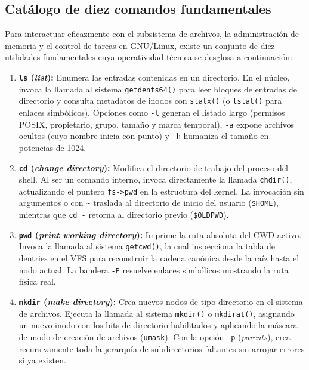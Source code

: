 \documentclass[12pt]{article}
\begin{document}
\subsection{Catálogo de diez comandos fundamentales}
\label{subsec:catalogoDiezComandosLinux}

Para interactuar eficazmente con el subsistema de archivos, la administración de memoria y el control de tareas en GNU/Linux, existe un conjunto de diez utilidades fundamentales cuya operatividad técnica se desglosa a continuación:

\begin{enumerate}[noitemsep, topsep=2pt]
    \item \textbf{\texttt{ls} (\textit{list}):} Enumera las entradas contenidas en un directorio. En el núcleo, invoca la llamada al sistema \texttt{getdents64()} para leer bloques de entradas de directorio y consulta metadatos de inodos con \texttt{statx()} (o \texttt{lstat()} para enlaces simbólicos). Opciones como \texttt{-l} generan el listado largo (permisos POSIX, propietario, grupo, tamaño y marca temporal), \texttt{-a} expone archivos ocultos (cuyo nombre inicia con punto) y \texttt{-h} humaniza el tamaño en potencias de 1024.
    \item \textbf{\texttt{cd} (\textit{change directory}):} Modifica el directorio de trabajo del proceso del shell. Al ser un comando interno, invoca directamente la llamada \texttt{chdir()}, actualizando el puntero \texttt{fs->pwd} en la estructura del kernel. La invocación sin argumentos o con \texttt{\textasciitilde} traslada al directorio de inicio del usuario (\texttt{\$HOME}), mientras que \texttt{cd -} retorna al directorio previo (\texttt{\$OLDPWD}).
    \item \textbf{\texttt{pwd} (\textit{print working directory}):} Imprime la ruta absoluta del CWD activo. Invoca la llamada al sistema \texttt{getcwd()}, la cual inspecciona la tabla de dentries en el VFS para reconstruir la cadena canónica desde la raíz hasta el nodo actual. La bandera \texttt{-P} resuelve enlaces simbólicos mostrando la ruta física real.
    \item \textbf{\texttt{mkdir} (\textit{make directory}):} Crea nuevos nodos de tipo directorio en el sistema de archivos. Ejecuta la llamada al sistema \texttt{mkdir()} o \texttt{mkdirat()}, asignando un nuevo inodo con los bits de directorio habilitados y aplicando la máscara de modo de creación de archivos (\texttt{umask}). Con la opción \texttt{-p} (\textit{parents}), crea recursivamente toda la jerarquía de subdirectorios faltantes sin arrojar errores si ya existen.

\end{enumerate}
\end{document}
